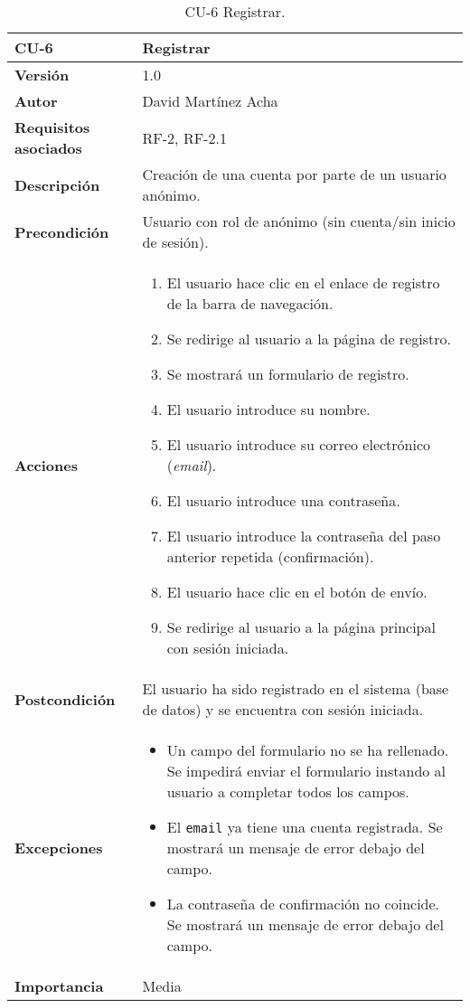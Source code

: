 \begin{table}[p]
	\centering
	\begin{tabularx}{\linewidth}{ p{} p{} }
		\toprule
		\textbf{CU-6}    & \textbf{Registrar}\\
		\toprule
		\textbf{Versión}              & 1.0    \\
		\textbf{Autor}                & David Martínez Acha \\
		\textbf{Requisitos asociados} & RF-2, RF-2.1 \\
		\textbf{Descripción}          & Creación de una cuenta por parte de un usuario anónimo. \\
		\textbf{Precondición}         & Usuario con rol de anónimo (sin cuenta/sin inicio de sesión). \\
		\textbf{Acciones}             &
		\begin{enumerate}
			\def\labelenumi{\arabic{enumi}.}
			\tightlist
			\item El usuario hace clic en el enlace de registro de la barra de navegación.
			\item Se redirige al usuario a la página de registro.
			\item Se mostrará un formulario de registro.
			\item El usuario introduce su nombre.
			\item El usuario introduce su correo electrónico (\textit{email}).
			\item El usuario introduce una contraseña.
			\item El usuario introduce la contraseña del paso anterior repetida (confirmación).
            \item El usuario hace clic en el botón de envío.
			\item Se redirige al usuario a la página principal con sesión iniciada.
		\end{enumerate}\\
		\textbf{Postcondición}        & El usuario ha sido registrado en el sistema (base de datos) y se encuentra con sesión iniciada. \\
		\textbf{Excepciones}          & \begin{itemize}
			\item Un campo del formulario no se ha rellenado. Se impedirá enviar el formulario instando al usuario a completar todos los campos.
			\item El \texttt{email} ya tiene una cuenta registrada. Se mostrará un mensaje de error debajo del campo.
			\item La contraseña de confirmación no coincide. Se mostrará un mensaje de error debajo del campo.
		\end{itemize}\\
		\textbf{Importancia}          & Media \\
		\bottomrule
	\end{tabularx}
	\caption{CU-6 Registrar.}
\end{table}

